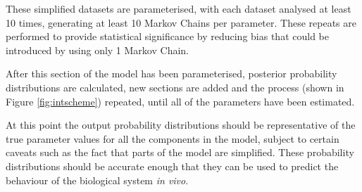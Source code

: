 These simplified datasets are parameterised, with each dataset analysed at least 10 times, generating at least 10 Markov Chains per parameter. These repeats are performed to provide statistical significance by reducing bias that could be introduced by using only 1 Markov Chain.

After this section of the model has been parameterised, posterior probability distributions are calculated, new sections are added and the process (shown in Figure \ref{fig:intscheme}) repeated, until all of the parameters have been estimated.

At this point the output probability distributions should be representative of the true parameter values for all the components in the model, subject to certain caveats such as the fact that parts of the model are simplified. These probability distributions should be accurate enough that they can be used to predict the behaviour of the biological system \textit{in vivo}.


